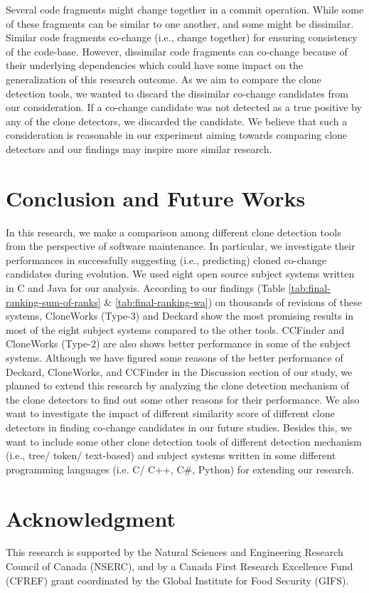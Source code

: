 \documentclass[review]{elsarticle}
\begin{document}
Several code fragments might change together in a commit operation. While some of these fragments can be similar to one another, and some might be dissimilar. Similar code fragments co-change (i.e., change together) for ensuring consistency of the code-base. However, dissimilar code fragments can co-change because of their underlying dependencies which could have some impact on the generalization of this research outcome. As we aim to compare the clone detection tools, we wanted to discard the dissimilar co-change candidates from our consideration. If a co-change candidate was not detected as a true positive by any of the clone detectors, we discarded the candidate. We believe that such a consideration is reasonable in our experiment aiming towards comparing clone detectors and our findings may inspire more similar research.

\vspace{2mm}
\section{Conclusion and Future Works}
\label{the-conclusion-future-works}
In this research, we make a comparison among different clone detection tools from the perspective of software maintenance. In particular, we investigate their performances in successfully suggesting (i.e., predicting) cloned co-change candidates during evolution. We used eight open source subject systems written in C and Java for our analysis. According to our findings (Table \ref{tab:final-ranking-sum-of-ranks} \& \ref{tab:final-ranking-wa}) on thousands of revisions of these systems, CloneWorks (Type-3) and Deckard show the most promising results in most of the eight subject systems compared to the other tools. CCFinder and CloneWorks (Type-2) are also shows better performance in some of the subject systems. Although we have figured some reasons of the better performance of Deckard, CloneWorks, and CCFinder in the Discussion section of our study, we planned to extend this research by analyzing the clone detection mechanism of the clone detectors to find out some other reasons for their performance. We also want to investigate the impact of different similarity score of different clone detectors in finding co-change candidates in our future studies. Besides this, we want to include some other clone detection tools of different detection mechanism (i.e., tree/ token/ text-based) and subject systems written in some different programming languages (i.e. C/ C++, C\#, Python) for extending our research. %

\section*{Acknowledgment}
This research is supported by the Natural Sciences and Engineering Research Council of Canada (NSERC), and by a Canada First Research Excellence Fund (CFREF) grant coordinated by the Global Institute for Food Security (GIFS).


\end{document}
